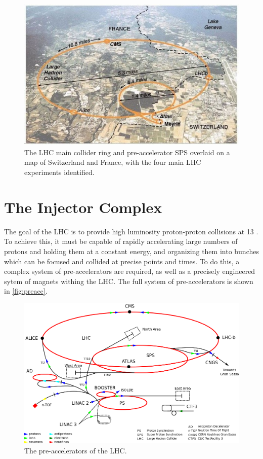 \begin{centering}
\begin{figure}[!hbt]
\myfloatalign
\includegraphics[width=.90\linewidth]{figures/lhc/lhc-5-640x420.jpg}
\caption{The \ac{LHC} main collider ring and pre-accelerator \ac{SPS} overlaid on a map of Switzerland and France, with the four main \ac{LHC} experiments identified.}
\label{fig:lhc_map}
\end{figure}
\end{centering}


\section{The Injector Complex}

The goal of the \ac{LHC} is to provide high luminosity proton-proton collisions at 13 \tev. To achieve this, it must be capable of rapidly accelerating large numbers of protons and holding them at a constant energy, and organizing them into bunches which can be focused and collided at precise points and times. To do this, a complex system of pre-accelerators are required, as well as a precisely engineered sytem of magnets withing the \ac{LHC}. The full system of pre-accelerators is shown in \autoref{fig:preacc}.

\begin{centering}
\begin{figure}[!hbt]
\myfloatalign
\includegraphics[width=.90\linewidth]{figures/lhc/Cern-accelerator-complex.png}
\caption{The pre-accelerators of the \ac{LHC}.}
\label{fig:preacc}
\end{figure}
\end{centering}

